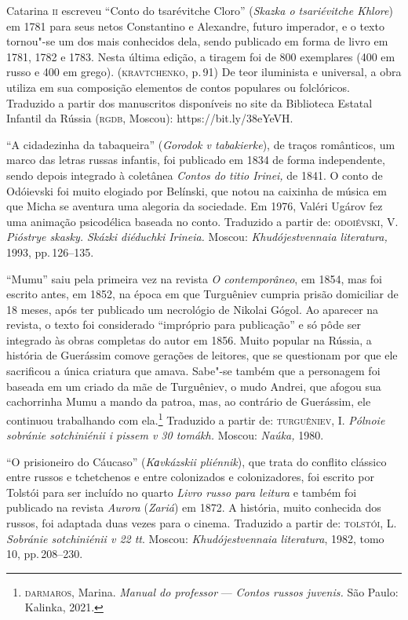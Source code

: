 \noindent{}Catarina \textsc{ii} escreveu ``Conto do tsarévitche Cloro'' (\emph{Skazka o tsariévitche Khlore}) em 1781 para seus
netos Constantino e Alexandre, futuro imperador, e o texto tornou"-se um
dos mais conhecidos dela, sendo publicado em forma de livro em 1781,
1782 e 1783. Nesta última edição, a tiragem foi de 800 exemplares (400
em russo e 400 em grego). (\textsc{kravtchenko}, p.\,91) De teor iluminista e
universal, a obra utiliza em sua composição elementos de contos
populares ou folclóricos. Traduzido a partir dos
manuscritos disponíveis no site da Biblioteca Estatal Infantil da Rússia
(\textsc{rgdb}, Moscou):
https://bit.ly/38eYeVH.

\medskip

``A cidadezinha da tabaqueira'' (\emph{Gorodok v tabakierke}), de traços
românticos, um marco das letras russas infantis, foi publicado em 1834
de forma independente, sendo depois integrado à coletânea \emph{Contos
do titio Irinei,} de 1841. O conto de Odóievski foi muito elogiado por
Belínski, que notou na caixinha de música em que Micha se
aventura uma alegoria da sociedade. Em 1976, Valéri Ugárov fez uma
animação psicodélica baseada no conto. Traduzido a partir de:
\textsc{odoiévski}, V. \emph{Pióstrye skasky. Skázki diéduchki Irineia.} Moscou:
\emph{Khudójestvennaia literatura,} 1993, pp.\,126--135.

\medskip

``Mumu'' saiu pela primeira vez na revista \emph{O contemporâneo}, em
1854, mas foi escrito antes, em 1852, na época em que Turguêniev cumpria
prisão domiciliar de 18 meses, após ter publicado um necrológio de
Nikolai Gógol. Ao aparecer na revista, o texto foi considerado
``impróprio para publicação'' e só pôde ser integrado às obras completas
do autor em 1856. Muito popular na Rússia, a história de Guerássim
comove gerações de leitores, que se questionam por que ele sacrificou a
única criatura que amava. Sabe"-se também que a personagem foi baseada em
um criado da mãe de Turguêniev, o mudo Andrei, que afogou sua
cachorrinha Mumu a mando da patroa, mas, ao contrário de Guerássim, ele
continuou trabalhando com ela.\footnote{\scriptsize\textsc{darmaros}, Marina. \emph{Manual
  do professor} --- \emph{Contos russos juvenis.} São Paulo: Kalinka, 2021.}
Traduzido a partir de:
\textsc{turguêniev}, I. \emph{Pólnoie sobránie sotchiniénii i pissem v 30
tomákh.} Moscou: \emph{Naúka,} 1980.

\medskip

``O prisioneiro do Cáucaso'' (\emph{Kаvkázskii pliénnik}), que trata do
conflito clássico entre russos e tchetchenos e entre colonizados e
colonizadores, foi escrito por Tolstói para ser incluído no quarto \emph{Livro russo
para leitura} e também foi publicado na revista \emph{Aurora}
(\emph{Zariá}) em 1872. A história, muito conhecida dos russos,
foi adaptada duas vezes para o cinema.
Traduzido a partir de:
\textsc{tolstói}, L. \emph{Sobránie sotchiniénii v 22 tt}. Moscou:
\emph{Khudójestvennaia literatura}, 1982, tomo 10, pp.\,208--230.

